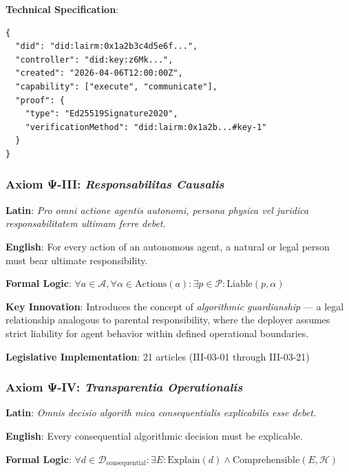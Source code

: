 \textbf{Technical Specification}:
\begin{verbatim}
{
  "did": "did:lairm:0x1a2b3c4d5e6f...",
  "controller": "did:key:z6Mk...",
  "created": "2026-04-06T12:00:00Z",
  "capability": ["execute", "communicate"],
  "proof": {
    "type": "Ed25519Signature2020",
    "verificationMethod": "did:lairm:0x1a2b...#key-1"
  }
}
\end{verbatim}

\vspace{0.5cm}

\subsubsection{Axiom Ψ-III: \textit{Responsabilitas Causalis}}

\begin{tcolorbox}[colback=orange!5!white,colframe=orange!75!black,title=Formal Statement]
\textbf{Latin}: \textit{Pro omni actione agentis autonomi, persona physica vel juridica responsabilitatem ultimam ferre debet.}

\textbf{English}: For every action of an autonomous agent, a natural or legal person must bear ultimate responsibility.

\textbf{Formal Logic}: $\forall a \in \mathcal{A}, \forall \alpha \in \text{Actions}(a) : \exists p \in \mathcal{P} : \text{Liable}(p, \alpha)$
\end{tcolorbox}

\textbf{Key Innovation}: Introduces the concept of \textit{algorithmic guardianship} — a legal relationship analogous to parental responsibility, where the deployer assumes strict liability for agent behavior within defined operational boundaries.

\textbf{Legislative Implementation}: 21 articles (III-03-01 through III-03-21)

\vspace{0.5cm}

\subsubsection{Axiom Ψ-IV: \textit{Transparentia Operationalis}}

\begin{tcolorbox}[colback=purple!5!white,colframe=purple!75!black,title=Formal Statement]
\textbf{Latin}: \textit{Omnis decisio algorith
mica consequentialis explicabilis esse debet.}

\textbf{English}: Every consequential algorithmic decision must be explicable.

\textbf{Formal Logic}: $\forall d \in \mathcal{D}_{\text{consequential}} : \exists E : \text{Explain}(d) \land \text{Comprehensible}(E, \mathcal{H})$
\end{tcolorbox}

